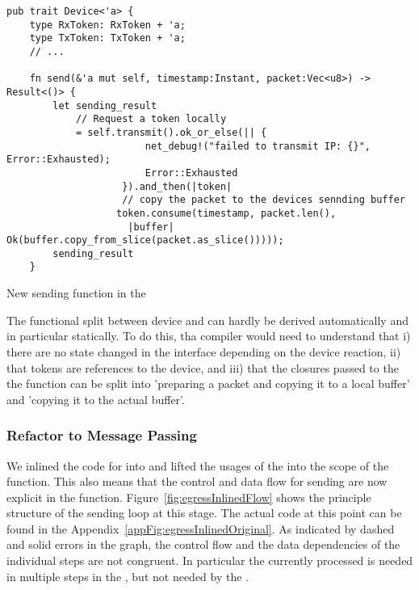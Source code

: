 \begin{codefigure}
   \begin{verbatim}
pub trait Device<'a> {
    type RxToken: RxToken + 'a;
    type TxToken: TxToken + 'a;
    // ... 
    
    fn send(&'a mut self, timestamp:Instant, packet:Vec<u8>) -> Result<()> {
        let sending_result
            // Request a token locally
            = self.transmit().ok_or_else(|| {
                        net_debug!("failed to transmit IP: {}", Error::Exhausted);
                        Error::Exhausted
                    }).and_then(|token|
                    // copy the packet to the devices sennding buffer
                   token.consume(timestamp, packet.len(),
                     |buffer| Ok(buffer.copy_from_slice(packet.as_slice()))));
        sending_result
    }                 
\end{verbatim}
\caption{New sending function in the \dev{}}
\label{fig:sendFun}
\end{codefigure}


The functional split between device and \stack{} can hardly be derived  automatically and in particular statically. To do this, tha compiler would need to understand that i) there are no state changed in the interface depending on the device reaction, ii) that tokens are references to the device, and iii) that the closures passed to the the  function can be split into 'preparing a packet and copying it to a local buffer' and 'copying it to the actual buffer'. 

\subsubsection{Refactor to Message Passing}

We inlined the code for  into  and lifted the usages of the \dev{} into the scope of the  function. This also means that the control and data flow for sending are now explicit in the  function. Figure~\ref{fig:egressInlinedFlow} shows the principle structure of the sending loop at this stage. The actual code at this point can be found in the Appendix~\ref{appFig:egressInlinedOriginal}. As indicated by dashed and solid errors in the graph, the control flow and the data dependencies of the individual steps are not congruent. In particular the currently processed  is needed in multiple steps in the \stack{}, but not needed by the \dev{}. 

